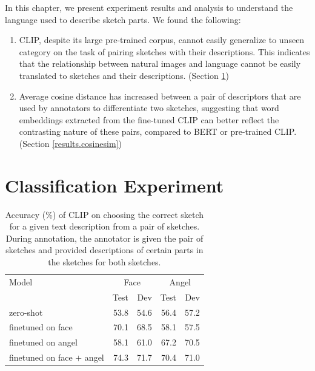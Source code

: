 
In this chapter, we present experiment results and analysis to understand the language used to describe sketch parts. We found the following:
\begin{enumerate}
    \item CLIP, despite its large pre-trained corpus, cannot easily generalize to unseen category on the task of pairing sketches with their descriptions. 
    This indicates that the relationship between natural images and language cannot be easily translated to sketches and their descriptions. (Section \ref{results.acc})
    \item Average cosine distance has increased between a pair of descriptors that are used by annotators to differentiate two sketches, suggesting that word embeddings extracted from the fine-tuned CLIP can better reflect the contrasting nature of these pairs, compared to BERT or pre-trained CLIP. (Section \ref{results.cosinesim})     
\end{enumerate}

\section{Classification Experiment} \label{results.acc}
    
\begin{table}[htb!]
\begin{minipage}{1\textwidth}
\begin{center}
{\small
\begin{tabular}{l|rrrr}
\toprule
Model & \multicolumn{2}{c}{Face} & \multicolumn{2}{c}{Angel}\\
~ & Test & Dev & Test & Dev \\
\midrule 
zero-shot & 53.8 & 54.6 & 56.4 & 57.2 \\
finetuned on face & 70.1 & 68.5 & 58.1 & 57.5 \\
finetuned on angel & 58.1 & 61.0 & 67.2 & 70.5 \\
finetuned on face $+$ angel & 74.3 & 71.7 & 70.4 & 71.0 \\
\bottomrule
\end{tabular}}
\caption{Accuracy (\%) of CLIP on choosing the correct sketch for a given text description from a pair of sketches. During annotation, the annotator is given the pair of sketches and provided descriptions of certain parts in the sketches for both sketches.}
\label{results.clip.acc}
\end{center}
\end{minipage} 
\end{table}

